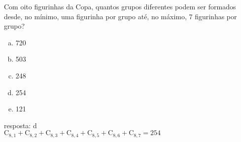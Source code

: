 \begin{ex}
 Com oito figurinhas da Copa, quantos grupos diferentes podem ser formados desde, no mínimo, uma figurinha por grupo até, no máximo, 7 figurinhas por grupo?
    \begin{enumerate}[(a)]
    \item 720
    \item 503
    \item 248
    \item 254
    \item 121
    \end{enumerate}
      \begin{sol}
        resposta: d \\
        $\mathrm{C}_{8,1}+\mathrm{C}_{8,2}+\mathrm{C}_{8,3}+\mathrm{C}_{8,4}+\mathrm{C}_{8,5}+\mathrm{C}_{8,6}+\mathrm{C}_{8,7}=254$
     \end{sol}
\end{ex}